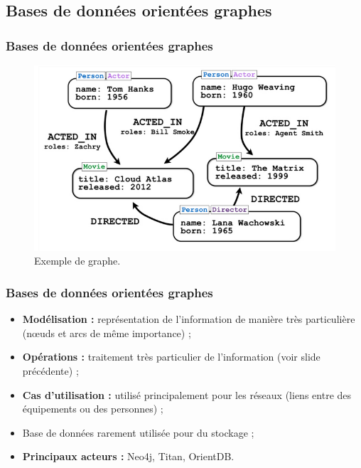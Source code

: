 	\subsection{Bases de données orientées graphes}
	\begin{frame}
		\frametitle{Bases de données orientées graphes}

		\begin{figure}[htb]
			\includegraphics[width=1\textwidth]{images/graphe.png}
			\caption{Exemple de graphe.}
		\end{figure}
	\end{frame}

	\begin{frame}
		\frametitle{Bases de données orientées graphes}

		\begin{itemize}
			\item \textbf{Modélisation :} représentation de l'information de manière très particulière (nœuds et arcs de même importance) ;
			\item \textbf{Opérations :} traitement très particulier de l'information (voir slide précédente) ;
			\item \textbf{Cas d'utilisation :} utilisé principalement pour les réseaux (liens entre des équipements ou des personnes) ;
			\item Base de données rarement utilisée pour du stockage ;
			\item \textbf{Principaux acteurs :} Neo4j, Titan, OrientDB.
		\end{itemize}
	\end{frame}

